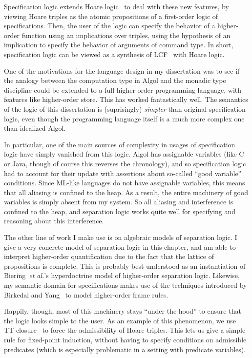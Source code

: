 Specification logic extends Hoare logic~\cite{hoare-logic} to deal
with these new features, by viewing Hoare triples as the atomic
propositions of a first-order logic of specifications. Then, the user
of the logic can specify the behavior of a higher-order function using
an implications over triples, using the hypothesis of an implication
to specify the behavior of arguments of command type. In short,
specification logic can be viewed as a synthesis of LCF~\cite{lcf} with
  Hoare logic.

One of the motivations for the language design in my dissertation was
to see if the analogy between the computation type in Algol and the
monadic type discipline could be extended to a full higher-order
programming language, with features like higher-order store. This has
worked fantastically well. The semantics of the logic of this
dissertation is (suprisingly) \emph{simpler} than original
specification logic, even though the programming language itself is a
much more complex one than idealized Algol.

In particular, one of the main sources of complexity in usages of
specification logic have simply vanished from this logic. Algol has
assignable variables (like C or Java, though of course this reverses
the chronology), and so specification logic had to account for their
update with assertions about so-called ``good variable''
conditions. Since ML-like languages do not have assignable variables,
this means that all aliasing is confined to the heap. As a result, the
entire machinery of good variables is simply absent from my system.
So all aliasing and interference is confined to the heap, and
separation logic works quite well for specifying and reasoning about
this interference.

The other line of work I make use is on algebraic models of separation
logic. I give a very concrete model of separation logic in this
chapter, and am able to interpret higher-order quantification due to
the fact that the lattice of propositions is complete. This is
probably best understood as an instantiation of Biering~\emph{et
  al.}'s hyperdoctrine model of higher-order separation
logic. Likewise, my semantic domain for specifications makes use of
the techniques introduced by Birkedal and Yang~\cite{birkedal-yang} to
model higher-order frame rules.

Happily, though, most of this machinery stays ``under the hood'' to
ensure that the logic looks simple to the user.  As an example of this
phenomenon, we use TT-closure~\cite{tt-closure} to force the
admissibility of Hoare triples. This lets us give a simple rule for
fixed-point induction, without having to specify conditions on
admissible predicates (which is especially problematic in a setting
with predicate variables).

